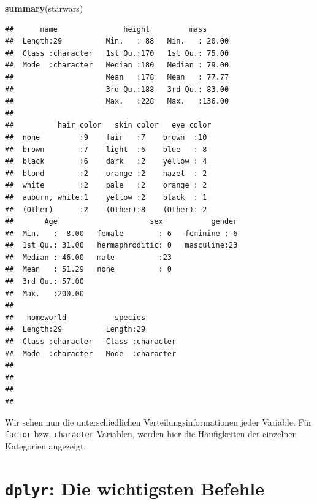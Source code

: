 \documentclass[
  ngerman,
]{book}
\newenvironment{Shaded}{\begin{snugshade}}{\end{snugshade}}
\newcommand{\FunctionTok}[1]{\textcolor[rgb]{0.13,0.29,0.53}{\textbf{#1}}}
\newcommand{\NormalTok}[1]{#1}
\begin{document}
\begin{Shaded}
\begin{Highlighting}[]
\FunctionTok{summary}\NormalTok{(starwars)}
\end{Highlighting}
\end{Shaded}

\begin{verbatim}
##      name               height         mass       
##  Length:29          Min.   : 88   Min.   : 20.00  
##  Class :character   1st Qu.:170   1st Qu.: 75.00  
##  Mode  :character   Median :180   Median : 79.00  
##                     Mean   :178   Mean   : 77.77  
##                     3rd Qu.:188   3rd Qu.: 83.00  
##                     Max.   :228   Max.   :136.00  
##                                                   
##          hair_color   skin_color   eye_color 
##  none         :9    fair   :7    brown  :10  
##  brown        :7    light  :6    blue   : 8  
##  black        :6    dark   :2    yellow : 4  
##  blond        :2    orange :2    hazel  : 2  
##  white        :2    pale   :2    orange : 2  
##  auburn, white:1    yellow :2    black  : 1  
##  (Other)      :2    (Other):8    (Other): 2  
##       Age                     sex           gender  
##  Min.   :  8.00   female        : 6   feminine : 6  
##  1st Qu.: 31.00   hermaphroditic: 0   masculine:23  
##  Median : 46.00   male          :23                 
##  Mean   : 51.29   none          : 0                 
##  3rd Qu.: 57.00                                     
##  Max.   :200.00                                     
##                                                     
##   homeworld           species         
##  Length:29          Length:29         
##  Class :character   Class :character  
##  Mode  :character   Mode  :character  
##                                       
##                                       
##                                       
## 
\end{verbatim}

Wir sehen nun die unterschiedlichen Verteilungsinformationen jeder Variable. Für \texttt{factor} bzw. \texttt{character} Variablen, werden hier die Häufigkeiten der einzelnen Kategorien angezeigt.

\section{\texorpdfstring{\texttt{dplyr}: Die wichtigsten Befehle}{dplyr: Die wichtigsten Befehle}}\label{dplyr-die-wichtigsten-befehle}
\end{document}
